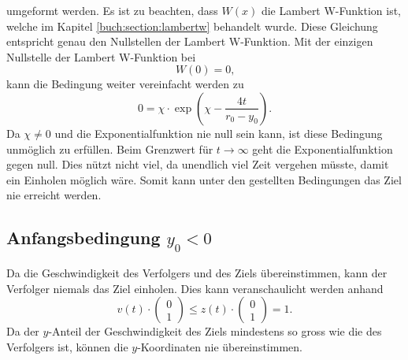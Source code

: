 umgeformt werden.
Es ist zu beachten, dass $W(x)$ die Lambert W-Funktion ist, welche im Kapitel  \eqref{buch:section:lambertw} behandelt wurde.
Diese Gleichung entspricht genau den Nullstellen der Lambert W-Funktion. Mit der einzigen Nullstelle der Lambert W-Funktion bei
\begin{equation*}
    W(0)=0
    \text{,}
\end{equation*}
kann die Bedingung weiter vereinfacht werden zu
\begin{equation}
    0
    =
    \chi\cdot \exp\left( \chi-\frac{4t}{r_0-y_0}\right)
    \text{.}
\end{equation}
Da $\chi\neq0$ und die Exponentialfunktion nie null sein kann, ist diese Bedingung unmöglich zu erfüllen.
Beim Grenzwert für $t\rightarrow\infty$ geht die Exponentialfunktion gegen null.
Dies nützt nicht viel, da unendlich viel Zeit vergehen müsste, damit ein Einholen möglich wäre.
Somit kann unter den gestellten Bedingungen das Ziel nie erreicht werden.
%
%
%
%
%
%
%
%
%
\subsection{Anfangsbedingung $y_0<0$}
Da die Geschwindigkeit des Verfolgers und des Ziels übereinstimmen, kann der Verfolger niemals das Ziel einholen.
Dies kann veranschaulicht werden anhand
%
\begin{equation}
    v(t)\cdot \left( \begin{array}{c} 0 \\ 1 \end{array}\right) 
    \leq
    z(t)\cdot \left( \begin{array}{c} 0 \\ 1 \end{array}\right) 
    =
    1\text{.}
\end{equation}
%
Da der $y$-Anteil der Geschwindigkeit des Ziels mindestens so gross wie die des Verfolgers ist, können die $y$-Koordinaten nie übereinstimmen.
%
